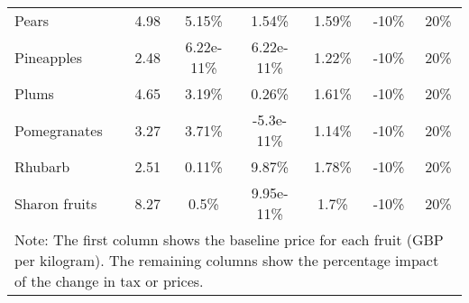 \documentclass[11pt]{article}
\begin{document}
\begin{table}[h]
\begin{center}
{\begin{tabular}{lcccccc}
Pears &4.98 &5.15\% &1.54\% &1.59\% &-10\% &20\% \\
Pineapples &2.48 &6.22e-11\% &6.22e-11\% &1.22\% &-10\% &20\% \\
Plums &4.65 &3.19\% &0.26\% &1.61\% &-10\% &20\% \\
Pomegranates &3.27 &3.71\% &-5.3e-11\% &1.14\% &-10\% &20\% \\
\hline
Rhubarb &2.51 &0.11\% &9.87\% &1.78\% &-10\% &20\% \\
Sharon fruits &8.27 &0.5\% &9.95e-11\% &1.7\% &-10\% &20\% \\
 \hline \hline
\multicolumn{7}{p{1.0 \textwidth}}{Note: The first column shows the baseline price for each fruit (GBP per kilogram). The remaining columns show the percentage impact of the change in tax or prices.}
\end{tabular}}
\end{center}
\end{table}
\end{document}
